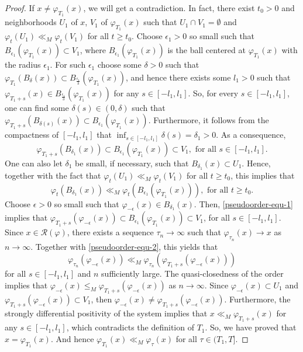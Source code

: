 \documentclass[a4paper,11pt]{article}
\theoremstyle{plain}
\theoremstyle{definition}
\numberwithin{equation}{section}
\begin{document}
\begin{proof}
	If $x\neq \varphi_{T_1}(x)$, we will get a contradiction. In fact, there exist $t_0>0$ and neighborhoods $U_1$ of $x$, $V_1$ of $\varphi_{T_1}(x)$ such that $U_1 \cap V_1=\emptyset$ and $\varphi_{t}(U_1) \ll_M \varphi_{t}(V_1)$ for all $t\geq t_0$. Choose $\epsilon_1>0$ so small such that $B_{\epsilon_1}(\varphi_{T_1}(x))\subset V_1$, where $B_{\epsilon_1}(\varphi_{T_1}(x))$ is the ball centered at $\varphi_{T_1}(x)$ with the radius $\epsilon_1$. For such $\epsilon_1$ choose some $\delta>0$ such that $\varphi_{T_1}(B_{\delta}(x))\subset B_{\frac{\epsilon_1}{3}}(\varphi_{T_1}(x))$, and hence there exists some $l_1>0$ such that $\varphi_{T_1+s}(x)\in B_{\frac{\epsilon_1}{3}}(\varphi_{T_1}(x))$ for any $s\in [-l_1,l_1]$. So, for every $s\in [-l_1,l_1]$, one can find some $\delta(s)\in (0,\delta)$ such that $\varphi_{T_1+s}(B_{\delta(s)}(x))\subset B_{\epsilon_1}(\varphi_{T_1}(x))$. Furthermore, it follows from the compactness of $[-l_1,l_1]$ that $\inf_{s\in [-l_1,l_1]}\delta(s)=\delta_1 >0$. As a consequence, 
	\begin{equation}\label{pseudoorder-equ-1}
		\varphi_{T_1+s}(B_{\delta_1}(x))\subset B_{\epsilon_1}(\varphi_{T_1}(x))\subset V_1, \text{ for all } s\in [-l_1,l_1].
	\end{equation}
	One can also let $\delta_1$ be small, if necessary, such that $B_{\delta_1}(x)\subset U_1$. Hence, together with the fact that $\varphi_{t}(U_1) \ll_M \varphi_{t}(V_1)$ for all $t\geq t_0$, this implies that
	\begin{equation}\label{pseudoorder-equ-2}
		\varphi_{t}(B_{\delta_1}(x))\ll_M \varphi_{t}(B_{\epsilon_1}(\varphi_{T_1}(x))), \text{ for all } t\geq t_0.
	\end{equation}
	Choose $\epsilon>0$ so small such that $\varphi_{-\epsilon}(x)\in B_{\delta_1}(x)$. Then, \eqref{pseudoorder-equ-1} implies that $\varphi_{T_1+s}(\varphi_{-\epsilon}(x))\subset B_{\epsilon_1}(\varphi_{T_1}(x))\subset V_1$, for all $s\in [-l_1,l_1]$. Since $x\in \mathcal{R}(\varphi)$, there exists a sequence $\tau_n \to \infty$ such that $\varphi_{\tau_n}(x)\to x$ as $n\to \infty$. Together with \eqref{pseudoorder-equ-2}, this yields that
	\[
	\varphi_{\tau_n}(\varphi_{-\epsilon}(x))\ll_M \varphi_{\tau_n}(\varphi_{T_1+s}(\varphi_{-\epsilon}(x)))
	\]
	for all $s\in [-l_1,l_1]$ and $n$ sufficiently large. The quasi-closedness of the order implies that $\varphi_{-\epsilon}(x)\leq_M \varphi_{T_1+s}(\varphi_{-\epsilon}(x))$ as $n\to \infty$. Since $\varphi_{-\epsilon}(x)\subset U_1$ and $\varphi_{T_1+s}(\varphi_{-\epsilon}(x))\subset V_1$, then $\varphi_{-\epsilon}(x)\neq \varphi_{T_1+s}(\varphi_{-\epsilon}(x))$. Furthermore, the strongly differential positivity of the system implies that $x\ll_M \varphi_{T_1+s}(x)$ for any $s\in [-l_1,l_1]$, which contradicts the definition of $T_1$. So, we have proved that $x= \varphi_{T_1}(x)$. And hence $\varphi_{T_1}(x)\ll_M \varphi_{\tau}(x)$ for all $\tau\in (T_1,T]$.
		

\end{proof}
\end{document}
